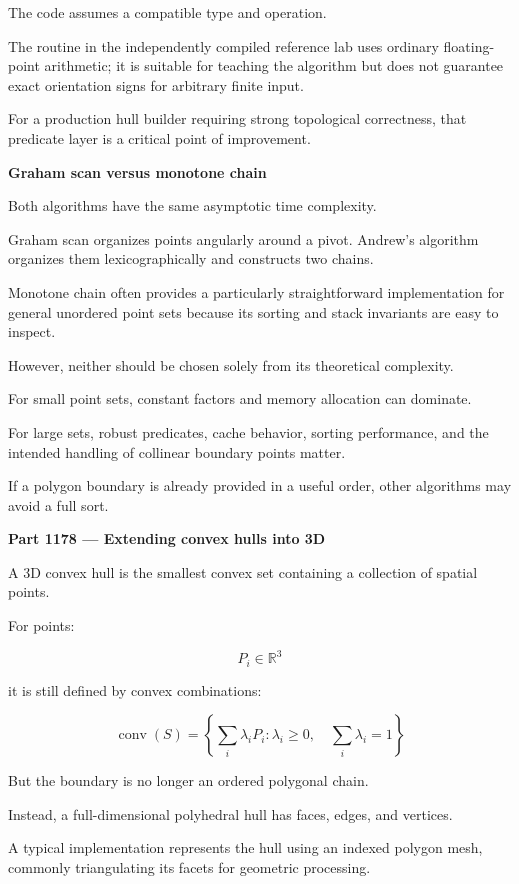 The code assumes a compatible  type and  operation.

The  routine in the independently compiled reference lab uses ordinary floating-point arithmetic; it is suitable for teaching the algorithm but does not guarantee exact orientation signs for arbitrary finite input.

For a production hull builder requiring strong topological correctness, that predicate layer is a critical point of improvement.

\textbf{Graham scan versus monotone chain}

Both algorithms have the same asymptotic time complexity.

Graham scan organizes points angularly around a pivot. Andrew's algorithm organizes them lexicographically and constructs two chains.

Monotone chain often provides a particularly straightforward implementation for general unordered point sets because its sorting and stack invariants are easy to inspect.

However, neither should be chosen solely from its theoretical complexity.

For small point sets, constant factors and memory allocation can dominate.

For large sets, robust predicates, cache behavior, sorting performance, and the intended handling of collinear boundary points matter.

If a polygon boundary is already provided in a useful order, other algorithms may avoid a full sort.

\textbf{Part 1178 --- Extending convex hulls into 3D}

A 3D convex hull is the smallest convex set containing a collection of spatial points.

For points:

\[
P_i\in\mathbb R^3
\]

it is still defined by convex combinations:

\[
\boxed{ \operatorname{conv}(S)= \left\{ \sum_i\lambda_iP_i: \lambda_i\ge0,\quad\sum_i\lambda_i=1 \right\} }
\]

But the boundary is no longer an ordered polygonal chain.

Instead, a full-dimensional polyhedral hull has faces, edges, and vertices.

A typical implementation represents the hull using an indexed polygon mesh, commonly triangulating its facets for geometric processing.

